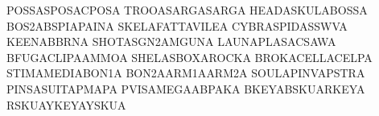 \def\dtSpriteType#1#2{\expandafter\gdef\csname dtSN#1\endcsname{#2}}
\def\dtSpriteKey#1{\ifcsname dtSN#1\endcsname\csname dtSN#1\endcsname\fi}
\def\dt@empty{}
\dtSpriteType{3004}{POSSA}\dtSpriteType{9}{SPOSA}\dtSpriteType{65}{CPOSA}
\dtSpriteType{3001}{TROOA}\dtSpriteType{3002}{SARGA}\dtSpriteType{58}{SARGA}
\dtSpriteType{3005}{HEADA}\dtSpriteType{3006}{SKULA}\dtSpriteType{3003}{BOSSA}
\dtSpriteType{69}{BOS2A}\dtSpriteType{68}{BSPIA}\dtSpriteType{71}{PAINA}
\dtSpriteType{66}{SKELA}\dtSpriteType{67}{FATTA}\dtSpriteType{64}{VILEA}
\dtSpriteType{16}{CYBRA}\dtSpriteType{7}{SPIDA}\dtSpriteType{84}{SSWVA}
\dtSpriteType{72}{KEENA}\dtSpriteType{88}{BBRNA}
\dtSpriteType{2001}{SHOTA}\dtSpriteType{82}{SGN2A}\dtSpriteType{2002}{MGUNA}
\dtSpriteType{2003}{LAUNA}\dtSpriteType{2004}{PLASA}\dtSpriteType{2005}{CSAWA}
\dtSpriteType{2006}{BFUGA}\dtSpriteType{2007}{CLIPA}\dtSpriteType{2048}{AMMOA}
\dtSpriteType{2008}{SHELA}\dtSpriteType{2049}{SBOXA}\dtSpriteType{2010}{ROCKA}
\dtSpriteType{2046}{BROKA}\dtSpriteType{2047}{CELLA}\dtSpriteType{17}{CELPA}
\dtSpriteType{2011}{STIMA}\dtSpriteType{2012}{MEDIA}\dtSpriteType{2014}{BON1A}
\dtSpriteType{2015}{BON2A}\dtSpriteType{2018}{ARM1A}\dtSpriteType{2019}{ARM2A}
\dtSpriteType{2013}{SOULA}\dtSpriteType{2022}{PINVA}\dtSpriteType{2023}{PSTRA}
\dtSpriteType{2024}{PINSA}\dtSpriteType{2025}{SUITA}\dtSpriteType{2026}{PMAPA}
\dtSpriteType{2045}{PVISA}\dtSpriteType{83}{MEGAA}\dtSpriteType{8}{BPAKA}
\dtSpriteType{5}{BKEYA}\dtSpriteType{40}{BSKUA}\dtSpriteType{13}{RKEYA}
\dtSpriteType{38}{RSKUA}\dtSpriteType{6}{YKEYA}\dtSpriteType{39}{YSKUA}

